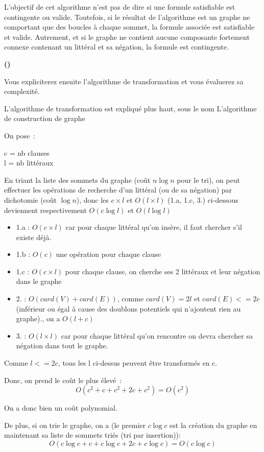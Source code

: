 \documentclass{article}
\newcounter{enoncecount}
\newcounter{sousenoncecount}
\newenvironment{sousenonce}
{
\stepcounter{sousenoncecount}
\bf\small (\alph{sousenoncecount})
\begin{bf}
}
{
\end{bf}
}
\begin{document}
L'objectif de cet algorithme n'est pas de dire si une formule satisfiable est contingente ou valide. Toutefois, si le résultat de
l'algorithme est un graphe ne comportant que des boucles à chaque sommet, la formule associée est satisfiable et valide. Autrement, et si le
graphe ne contient aucune composante fortement connexe contenant un littéral et sa négation, la formule est contingente.


\begin{sousenonce}
Vous expliciterez ensuite l'algorithme de transformation et vous évaluerez sa complexité.
\end{sousenonce}

L'algorithme de transformation est expliqué plus haut, sous le nom \og L'algorithme de construction de graphe\fg{}

On pose~:

c = nb clauses \\
l = nb littéraux

En triant la liste des sommets du graphe (coût $n \log n$ pour le tri), on peut effectuer les opérations de recherche d'un littéral (ou de sa négation) par dichotomie (coût $\log n$), donc les $c \times l$ et $O(l \times l)$ (1.a, 1.c, 3.) ci-dessous deviennent respectivement $O(c \log l)$ et $O(l \log l)$


\begin{itemize}
\item 1.a : $O(c \times l)$ car pour chaque littéral qu'on insère, il faut chercher s'il existe déjà.
\item 1.b : $O(c)$ une opération pour chaque clause
\item 1.c : $O(c \times l)$ pour chaque clause, on cherche ses 2 littéraux et leur négation dans le graphe
\item 2. : $O(card(V) + card(E))$, comme $card(V) = 2l$ et $card(E) <= 2c$ (inférieur ou égal à cause des doublons potentiels qui n'ajoutent rien au graphe)., on a $O(l+c)$
\item 3. : $O(l \times l)$ car pour chaque littéral qu'on rencontre on devra chercher sa négation dans tout le graphe.
\end{itemize}

Comme $l <= 2c$, tous les l ci-dessus peuvent être transformés en c.

Donc, on prend le coût le plus élevé~:
$$
O(c^2 + c + c^2 + 2c + c^2) = O(c^2)
$$

On a donc bien un coût polynomial.

De plus, si on trie le graphe, on a (le premier $c \log c$ est la création du graphe en maintenant sa liste de sommets triés (tri par insertion)):
$$
O(c \log c + c + c \log c + 2c + c \log c) = O(c \log c)
$$
\end{document}
